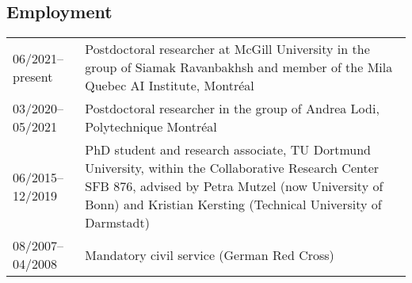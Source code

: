 \documentclass[11pt, a4paper, DIV=12]{scrartcl}
\begin{document}
\subsection*{Employment}
\begin{tabular}{p{3.0cm}p{11.5cm}}
	06/2021--present& Postdoctoral researcher at McGill University in the group of Siamak Ravanbakhsh and member of the Mila Quebec AI Institute, Montréal\\
	03/2020--05/2021& Postdoctoral researcher in the group of Andrea Lodi, Polytechnique Montréal\\
	06/2015--12/2019&PhD student and research associate, TU Dortmund University, within the Collaborative Research Center SFB 876, advised by Petra Mutzel (now University of Bonn) and Kristian Kersting (Technical University of Darmstadt)\\
	08/2007--04/2008&Mandatory civil service (German Red Cross)\\
\end{tabular}

\renewcommand{\refname}{\large\bfseries Publications}
\end{document}
